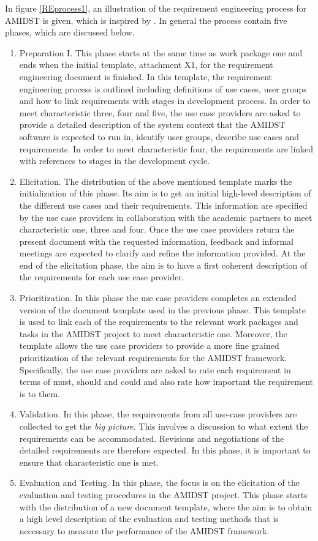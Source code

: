 \documentclass[11pt, oneside]{article}   	%
\begin{document}
In figure \ref{REprocess1}, an illustration of the requirement engineering process for AMIDST is given, which is inspired by \cite{Ebe10}.  In general the process contain five phases, which are discussed below.
\begin{enumerate}
\item Preparation I.  This phase starts at the same time as work package one and ends when the initial template, attachment X1, for the requirement engineering document is finished.  In this template, the requirement engineering process is outlined including definitions of use cases, user groups and how to link requirements with stages in development process.  In order to meet characteristic three, four and five, the use case providers are asked to provide a detailed description of the system context that the AMIDST software is expected to run in, identify user groups, describe use cases and requirements.  In order to meet characteristic four, the requirements are linked with references to stages in the development cycle. 
\item Elicitation. The distribution of the above mentioned template marks the initialization of this phase.  Its aim is to get an initial high-level description of the different use cases and their requirements. This information are specified by the use case providers in collaboration with the academic partners to meet characteristic one, three and four.  Once the use case providers return the present document with the requested information, feedback and informal meetings are expected to clarify and refine the information provided.  At the end of the elicitation phase, the aim is to have a first coherent description of the requirements for each use case provider.
 \item Prioritization. In this phase the use case providers completes an extended version of the document template used in the previous phase. This template is used to link each of the requirements to the relevant work packages and tasks in the AMIDST project to meet characteristic one. Moreover, the template allows the use case providers to provide a more fine grained prioritization of the relevant requirements for the AMIDST framework.  Specifically, the use case providers are asked to rate each requirement in terms of must, should and could and also rate how important the requirement is to them.  
\item Validation. In this phase, the requirements from all use-case providers are collected to get the \emph{big picture}.  This involves a discussion to what extent the requirements can be accommodated. Revisions and negotiations of the detailed requirements are therefore expected.  In this phase, it is important to ensure that characteristic one is met.
 \item Evaluation and Testing. In this phase, the focus is on the elicitation of the evaluation and testing procedures in the AMIDST project. This phase starts with the distribution of a new document template, where the aim is to obtain a high level description of the evaluation and testing methods that is necessary to measure the performance of the AMIDST framework.
\end{enumerate}
\end{document}
